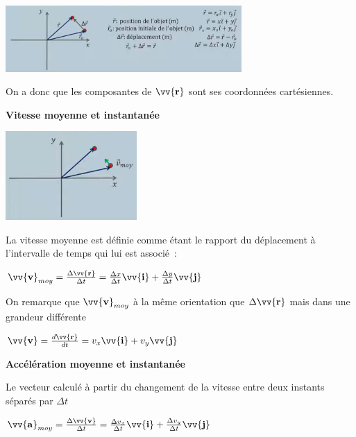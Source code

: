 \documentclass{article}
\begin{document}
    \includegraphics[width=9cm]{Image/VecteurPosition.png}
\newline

On a donc que les composantes de $\vv{\mathbf{r}}$ sont ses coordonnées cartésiennes.
\newline

\noindent
\textbf{Vitesse moyenne et instantanée}
\newline

\includegraphics[width=5cm]{Image/VecteurVitesse.png}

\newline

\noindent
La vitesse moyenne est définie comme étant le rapport du déplacement à l'intervalle de temps qui lui est associé :
\newline

$\vv{\mathbf{v}}_{moy} = \frac{\Delta \vv{\mathbf{r}}}{\Delta t} = \frac{\Delta x}{\Delta t}\vv{\mathbf{i}} + \frac{\Delta y}{\Delta t}\vv{\mathbf{j}}$
\newline

\noindent
On remarque que $\vv{\mathbf{v}}_{moy}$ à la même orientation que $\Delta \vv{\mathbf{r}}$ mais dans une grandeur différente
\newline

$\vv{\mathbf{v}} = \frac{d\vv{\mathbf{r}}}{dt} = v_x\vv{\mathbf{i}} + v_y\vv{\mathbf{j}}$
\newline

\noindent
\textbf{Accélération moyenne et instantanée}
\newline

Le vecteur calculé à partir du changement de la vitesse entre deux instants séparés par $\Delta t$
\newline

$\vv{\mathbf{a}}_{moy} = \frac{\Delta \vv{\mathbf{v}}}{\Delta t} = \frac{\Delta v_x}{\Delta t}\vv{\mathbf{i}} + \frac{\Delta v_y}{\Delta t}\vv{\mathbf{j}}$
\end{document}
